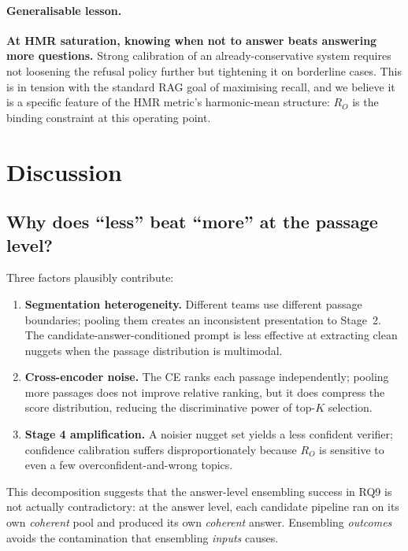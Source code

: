 \documentclass[11pt,a4paper]{article}
\begin{document}
\paragraph{Generalisable lesson.} \textbf{At HMR saturation, knowing when
not to answer beats answering more questions.} Strong calibration of an
already-conservative system requires not loosening the refusal policy
further but tightening it on borderline cases. This is in tension with
the standard RAG goal of maximising recall, and we believe it is a
specific feature of the HMR metric's harmonic-mean structure: $R_O$ is
the binding constraint at this operating point.

\section{Discussion}

\subsection{Why does ``less'' beat ``more'' at the passage level?}

Three factors plausibly contribute:

\begin{enumerate}[leftmargin=*]
  \item \textbf{Segmentation heterogeneity.} Different teams use
    different passage boundaries; pooling them creates an inconsistent
    presentation to Stage~2. The candidate-answer-conditioned prompt is
    less effective at extracting clean nuggets when the passage
    distribution is multimodal.
  \item \textbf{Cross-encoder noise.} The CE ranks each passage
    independently; pooling more passages does not improve relative
    ranking, but it does compress the score distribution, reducing the
    discriminative power of top-$K$ selection.
  \item \textbf{Stage 4 amplification.} A noisier nugget set yields a
    less confident verifier; confidence calibration suffers
    disproportionately because $R_O$ is sensitive to even a few
    overconfident-and-wrong topics.
\end{enumerate}

This decomposition suggests that the answer-level ensembling success
in RQ9 is not actually contradictory: at the answer level, each
candidate pipeline ran on its own \emph{coherent} pool and produced
its own \emph{coherent} answer. Ensembling \emph{outcomes} avoids the
contamination that ensembling \emph{inputs} causes.
\end{document}
